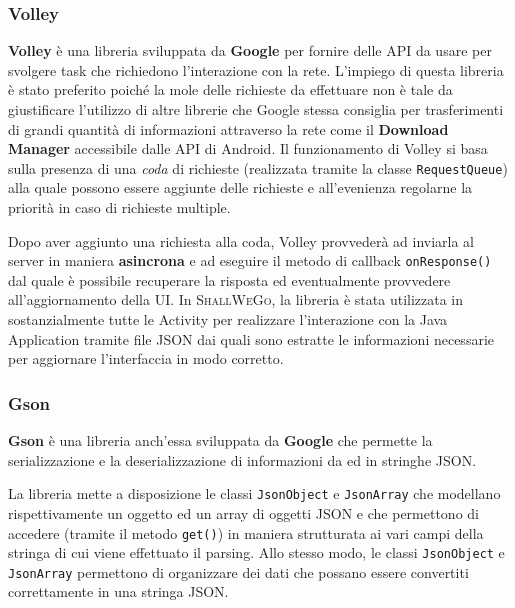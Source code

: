                 \subsubsection{Volley}
                    \textbf{Volley} è una libreria sviluppata da \textbf{Google} per fornire delle API da usare per svolgere task che richiedono l'interazione con la rete. L'impiego di questa libreria è stato preferito poiché la mole delle richieste da effettuare non è tale da giustificare l'utilizzo di altre librerie che Google stessa consiglia per trasferimenti di grandi quantità di informazioni attraverso la rete come il \textbf{Download Manager} accessibile dalle API di Android. Il funzionamento di Volley si basa sulla presenza di una \textit{coda} di richieste (realizzata tramite la classe \texttt{RequestQueue}) alla quale possono essere aggiunte delle richieste e all'evenienza regolarne la priorità in caso di richieste multiple.

                    Dopo aver aggiunto una richiesta alla coda, Volley provvederà ad inviarla al server in maniera \textbf{asincrona} e ad eseguire il metodo di callback \texttt{onResponse()} dal quale è possibile recuperare la risposta ed eventualmente provvedere all'aggiornamento della UI. In \textsc{ShallWeGo}, la libreria è stata utilizzata in sostanzialmente tutte le Activity per realizzare l'interazione con la Java Application tramite file JSON dai quali sono estratte le informazioni necessarie per aggiornare l'interfaccia in modo corretto.
                
                \subsubsection{Gson}
                    \textbf{Gson} è una libreria anch'essa sviluppata da \textbf{Google} che permette la serializzazione e la deserializzazione di informazioni da ed in stringhe JSON.
                    
                    La libreria mette a disposizione le classi \texttt{JsonObject} e \texttt{JsonArray} che modellano rispettivamente un oggetto ed un array di oggetti JSON e che permettono di accedere (tramite il metodo \texttt{get()}) in maniera strutturata ai vari campi della stringa di cui viene effettuato il parsing. Allo stesso modo, le classi \texttt{JsonObject} e \texttt{JsonArray} permettono di organizzare dei dati che possano essere convertiti correttamente in una stringa JSON.
                    
